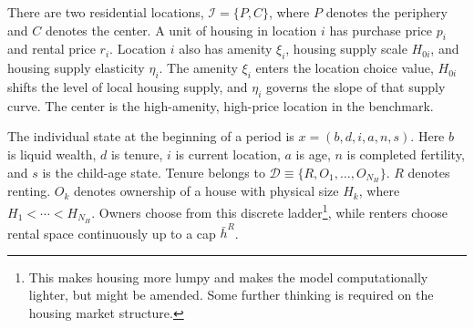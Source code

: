\documentclass[11pt]{article}
\newcommand{\Iset}{\mathcal I}
\newcommand{\Dset}{\mathcal D}
\begin{document}
There are two residential locations, $\Iset=\{P,C\}$, where $P$ denotes the periphery and $C$ denotes the center. A unit of housing in location $i$ has purchase price $p_i$ and rental price $r_i$. Location $i$ also has amenity $\xi_i$, housing supply scale $H_{0i}$, and housing supply elasticity $\eta_i$. The amenity $\xi_i$ enters the location choice value, $H_{0i}$ shifts the level of local housing supply, and $\eta_i$ governs the slope of that supply curve. The center is the high-amenity, high-price location in the benchmark.

The individual state at the beginning of a period is $x=(b,d,i,a,n,s)$. Here $b$ is liquid wealth, $d$ is tenure, $i$ is current location, $a$ is age, $n$ is completed fertility, and $s$ is the child-age state. Tenure belongs to $\Dset\equiv\{R,O_1,\ldots,O_{N_H}\}$. $R$ denotes renting. $O_k$ denotes ownership of a house with physical size $H_k$, where $H_1<\cdots<H_{N_H}$. Owners choose from this discrete ladder\footnote{This makes housing more lumpy and makes the model computationally lighter, but might be amended. Some further thinking is required on the housing market structure.}, while renters choose rental space continuously up to a cap $\bar h^R$.
\end{document}
